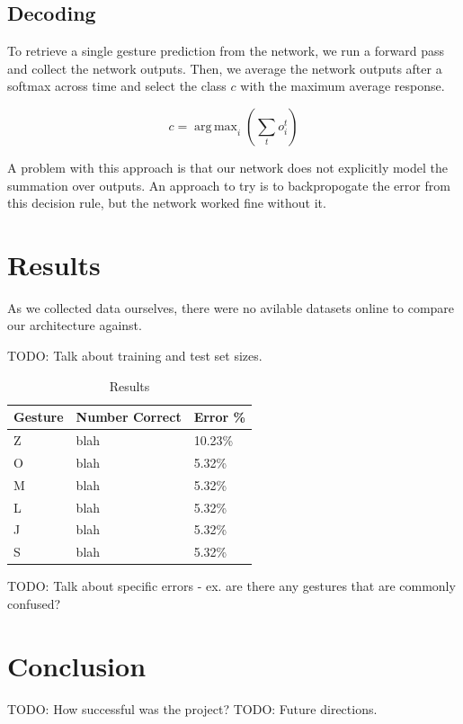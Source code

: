 \documentclass[11pt]{article}
\DeclareMathOperator*{\argmax}{arg\,max}
\begin{document}
\subsection{Decoding}

To retrieve a single gesture prediction from the network,
we run a forward pass and collect the network outputs. 
Then, we average the network outputs after a softmax
across time and select the class \(c\) with the maximum average response.

\[ c = \argmax_{i}(\sum_{t} o_{i}^{t}) \]

A problem with this approach is that our network does not
explicitly model the summation over outputs. An approach to try is to
backpropogate the error from this decision rule, but the network
worked fine without it.

\section{Results}

As we collected data ourselves, there were no avilable datasets
online to compare our architecture against.

TODO: Talk about training and test set sizes.

\begin{table}[h]
\begin{center}
\begin{tabular}{|l|l|l|}
\hline \bf Gesture & \bf Number Correct & \bf Error \% \\ \hline
Z & blah & 10.23\% \\
O & blah & 5.32\% \\
M & blah & 5.32\% \\
L & blah & 5.32\% \\
J & blah & 5.32\% \\
S & blah & 5.32\% \\
\hline
\end{tabular}
\end{center}
\caption{\label{font-table} Results }
\end{table}

TODO: Talk about specific errors - ex. are there any gestures
that are commonly confused?

\section{Conclusion}

TODO: How successful was the project?
TODO: Future directions.
\end{document}
